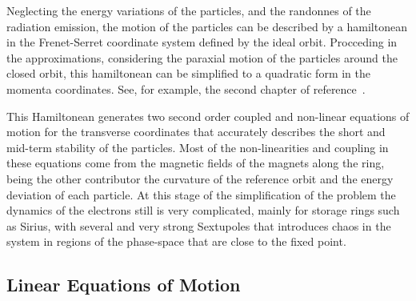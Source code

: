     Neglecting the energy variations of the particles, and the randonnes of the radiation emission, the motion of the particles can be described by a hamiltonean in the Frenet-Serret coordinate system defined by the ideal orbit. Procceding in the approximations, considering the paraxial motion of the particles around the closed orbit, this hamiltonean can be simplified to a quadratic form in the momenta coordinates. See, for example, the second chapter of reference~\cite[pp. 32]{LeeBook}.

    This Hamiltonean generates two second order coupled and non-linear equations of motion for the transverse coordinates that accurately describes the short and mid-term stability of the particles. Most of the non-linearities and coupling in these equations come from the magnetic fields of the magnets along the ring, being the other contributor the curvature of the reference orbit and the energy deviation of each particle. At this stage of the simplification of the problem the dynamics of the electrons still is very complicated, mainly for storage rings such as Sirius, with several and very strong Sextupoles that introduces chaos in the system in regions of the phase-space that are close to the fixed point.

\subsection{Linear Equations of Motion}

